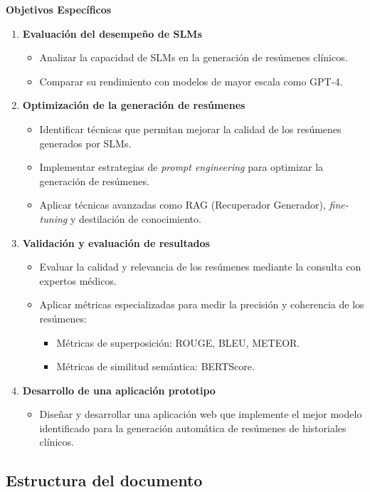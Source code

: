 \documentclass[../main.tex]{subfiles}
\begin{document}
\textbf{Objetivos Específicos}  
\begin{enumerate}
    \item \textbf{Evaluación del desempeño de SLMs}
    \begin{itemize}
        \item Analizar la capacidad de SLMs en la generación de resúmenes clínicos.
        \item Comparar su rendimiento con modelos de mayor escala como GPT-4.
    \end{itemize}
    \item \textbf{Optimización de la generación de resúmenes}
    \begin{itemize}
        \item Identificar técnicas que permitan mejorar la calidad de los resúmenes generados por SLMs.
        \item Implementar estrategias de \textit{prompt engineering} para optimizar la generación de resúmenes.
        \item Aplicar técnicas avanzadas como RAG (Recuperador Generador), \textit{fine-tuning} y destilación de conocimiento.
    \end{itemize}
    \item \textbf{Validación y evaluación de resultados}
    \begin{itemize}
        \item Evaluar la calidad y relevancia de los resúmenes mediante la consulta con expertos médicos.
        \item Aplicar métricas especializadas para medir la precisión y coherencia de los resúmenes:
        \begin{itemize}
            \item Métricas de superposición: ROUGE, BLEU, METEOR.
            \item Métricas de similitud semántica: BERTScore.
        \end{itemize}
    \end{itemize}
    \item \textbf{Desarrollo de una aplicación prototipo}
    \begin{itemize}
        \item Diseñar y desarrollar una aplicación web que implemente el mejor modelo identificado para la generación
        automática de resúmenes de historiales clínicos.
    \end{itemize}
\end{enumerate}

\subsection{Estructura del documento}
\end{document}
